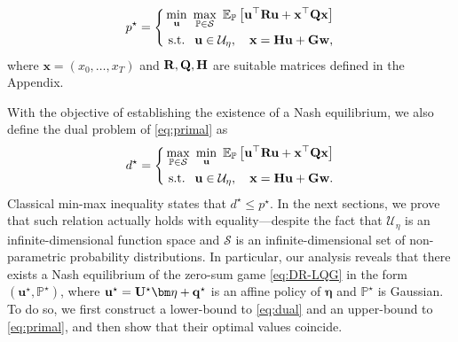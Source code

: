 \documentclass[letterpaper, 10 pt, conference]{ieeeconf}  %
\theoremstyle{ieeeconf}
\newcommand{\R}{\mathbb{R}}
\newcommand{\Prob}{\mathbb{P}}
\begin{document}
\begin{equation}
    \label{eq:primal}
    p^\star =
    \left\{
    \begin{aligned}
    &\min_{\bf u}\ \max_{\mathbb{P} \in \mathcal{S}}\ \mathbb{E}_{\mathbb{P}}\left[\bf u^{\top} R u + x^{\top} Q x \right]
    \\
    &\text { s.t. }\ \mathbf{u} \in \mathcal{U}_{\eta}, \quad \bf x = H u + G w,
    \end{aligned}
    \right.
\end{equation}
where $\mathbf{x} = (x_0, \dots, x_T)$ and $\bf R, Q, H$ are suitable matrices defined in the Appendix.


With the objective of establishing the existence of a Nash equilibrium, we also define the dual problem of \eqref{eq:primal} as
\begin{equation}
    \label{eq:dual}
    d^\star =
    \left\{
    \begin{aligned}
    &\max_{\mathbb{P} \in \mathcal{S}}\ \min_{\bf u}\ \mathbb{E}_{\mathbb{P}}\left[\bf u^{\top} R u + x^{\top} Q x \right]
    \\
    &\text { s.t. }\ \mathbf{u} \in \mathcal{U}_{\eta}, \quad \bf x = H u + G w.
    \end{aligned}
    \right.
\end{equation}
Classical min-max inequality states that $d^\star \leq p^\star$. In the next sections, we prove that such relation actually holds with equality—despite the fact that $\mathcal{U}_\eta$ is an infinite-dimensional function space and $\mathcal{S}$ is an infinite-dimensional set of non-parametric probability distributions. In particular, our analysis reveals that there exists a Nash equilibrium of the zero-sum game \eqref{eq:DR-LQG} in the form $(\mathbf{u}^\star, \Prob^\star)$, where $\bf u^\star = U^\star\bm\eta + q^\star$ is an affine policy of $\bm\eta$ and $\Prob^\star$ is Gaussian. To do so, we first construct a lower-bound to \eqref{eq:dual} and an upper-bound to \eqref{eq:primal}, and then show that their optimal values coincide.
\end{document}

